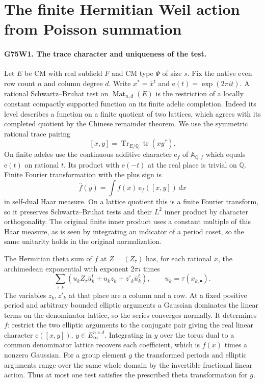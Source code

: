 \section{The finite Hermitian Weil action from Poisson summation}

\paragraph{G75W1. The trace character and uniqueness of the test.}
Let $E$ be CM with real subfield $F$ and CM type $\Psi$ of size $s$.
Fix the native even row count $n$ and column degree $d$.
Write $x^*=\bar x^{\mathsf t}$ and $\mathrm e(t)=\exp(2\pi i t)$.
A rational Schwartz--Bruhat test on $\operatorname{Mat}_{n,d}(E)$
is the restriction of a locally constant compactly supported function
on its finite adelic completion. Indeed its level describes a function
on a finite quotient of two lattices, which agrees with its completed
quotient by the Chinese remainder theorem. We use the symmetric
rational trace pairing
\[
 [x,y]=\operatorname{Tr}_{E/\mathbb Q}\operatorname{tr}(xy^*).
\]
On finite adeles use the continuous additive character $\mathrm e_f$
of $\mathbb A_{\mathbb Q,f}$ which equals $\mathrm e(t)$ on rational
$t$. Its product with $\mathrm e(-t)$ at the real place is trivial
on $\mathbb Q$. Finite Fourier transformation with the plus sign is
\[
 \widehat f(y)=\int f(x)\,\mathrm e_f([x,y])\,dx
\]
in self-dual Haar measure. On a lattice quotient this is a finite
Fourier transform, so it preserves Schwartz--Bruhat tests and their
$L^2$ inner product by character orthogonality. The original finite
inner product uses a constant multiple of this Haar measure, as is
seen by integrating an indicator of a period coset, so the same
unitarity holds in the original normalization.

The Hermitian theta sum of $f$ at $Z=(Z_\tau)$ has, for each rational
$x$, the archimedean exponential with exponent $2\pi i$ times
\[
 \sum_{\tau,k}(u_k Z_\tau\bar u_k^t+
               u_k z_k+z'_k\bar u_k^t),\qquad u_k=\tau(x_{k,\bullet}).
\]
The variables $z_k,z'_k$ at that place are a column and a row.
At a fixed positive period and arbitrary bounded elliptic arguments
a Gaussian dominates the linear terms on the denominator lattice,
so the series converges normally. It determines $f$: restrict the
two elliptic arguments to the conjugate pair giving the real linear
character $\mathrm e([x,y])$, $y\in E_\infty^{n\times d}$.
Integrating in $y$ over the torus dual to a common denominator lattice
recovers each coefficient, which is $f(x)$ times a nonzero Gaussian.
For a group element $g$ the transformed periods and elliptic
arguments range over the same whole domain by the invertible
fractional linear action. Thus at most one test satisfies the
prescribed theta transformation for $g$.

